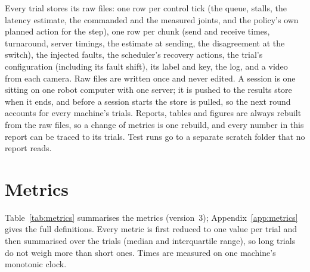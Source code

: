 Every trial stores its raw files: one row per control tick (the queue, stalls, the latency estimate, the commanded and
the measured joints, and the policy's own planned action for the step), one row per chunk (send and receive times,
turnaround, server timings, the estimate at sending, the disagreement at the switch), the injected faults, the
scheduler's recovery actions, the trial's configuration (including its fault shift), its label and key, the log, and a
video from each camera. Raw files are written once and never edited. A session is one sitting on one robot computer
with one server; it is pushed to the results store when it ends, and before a session starts the store is pulled, so
the next round accounts for every machine's trials. Reports, tables and figures are always rebuilt from the raw files,
so a change of metrics is one rebuild, and every number in this report can be traced to its trials. Test runs go to a
separate scratch folder that no report reads.

\section{Metrics}\label{sec:metrics}

Table~\ref{tab:metrics} summarises the metrics (version~3); Appendix~\ref{app:metrics} gives the full definitions.
Every metric is first reduced to one value per trial and then summarised over the trials (median and interquartile
range), so long trials do not weigh more than short ones. Times are measured on one machine's monotonic clock.

